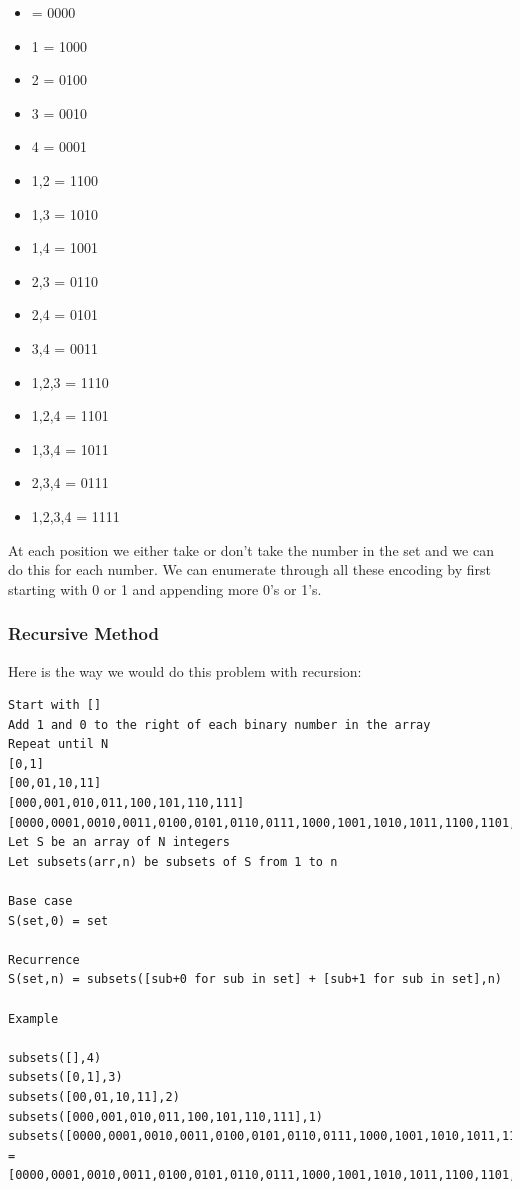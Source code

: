 \documentclass[11pt,oneside]{book}
\begin{document}
\begin{itemize}
\item {} = 0000
\item {1} = 1000
\item {2} = 0100
\item {3} = 0010
\item {4} = 0001
\item {1,2} = 1100
\item {1,3} = 1010
\item {1,4} = 1001
\item {2,3} = 0110
\item {2,4} = 0101
\item {3,4} = 0011
\item {1,2,3} = 1110
\item {1,2,4} = 1101
\item {1,3,4} = 1011
\item {2,3,4} = 0111
\item {1,2,3,4} = 1111
\end{itemize}

At each position we either take or don't take the number in the set and we can do this for each number. We can enumerate through all these encoding by first starting with 0 or 1 and appending more 0's or 1's.

\subsubsection{Recursive Method}

Here is the way we would do this problem with recursion:

\begin{lstlisting}
Start with []
Add 1 and 0 to the right of each binary number in the array
Repeat until N
[0,1]
[00,01,10,11]
[000,001,010,011,100,101,110,111]
[0000,0001,0010,0011,0100,0101,0110,0111,1000,1001,1010,1011,1100,1101,1110,1111]
Let S be an array of N integers
Let subsets(arr,n) be subsets of S from 1 to n
 
Base case
S(set,0) = set
 
Recurrence
S(set,n) = subsets([sub+0 for sub in set] + [sub+1 for sub in set],n)
 
Example
 
subsets([],4)
subsets([0,1],3)
subsets([00,01,10,11],2)
subsets([000,001,010,011,100,101,110,111],1)
subsets([0000,0001,0010,0011,0100,0101,0110,0111,1000,1001,1010,1011,1100,1101,1110,1111],0)
=
[0000,0001,0010,0011,0100,0101,0110,0111,1000,1001,1010,1011,1100,1101,1110,1111]
 \end{lstlisting}
\end{document}

